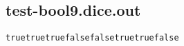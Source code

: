 \subsection{test-bool9.dice.out}
\begin{verbatim}
truetruetruefalsefalsetruetruefalse

\end{verbatim}